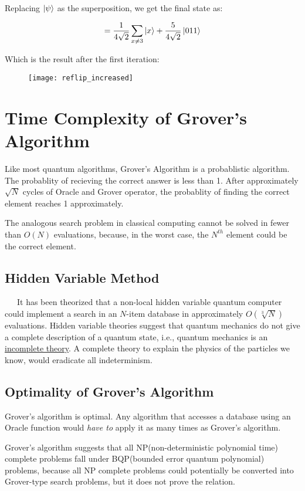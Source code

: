 \documentclass[a4paper]{article}
\begin{document}
Replacing $\ket{\psi}$ as the superposition, we get the final state as:

$$ = \frac{1}{4\sqrt{2}}\sum_{x \neq 3}{\ket{x}} + \frac{5}{4\sqrt{2}}\ket{011} $$

Which is the result after the first iteration:

\begin{figure}[h]
\texttt{[image: reflip\_increased]}
\centering
\end{figure}

\pagebreak

\section{ Time Complexity of Grover's Algorithm }

Like most quantum algorithms, Grover's Algorithm is a probablistic algorithm.
The probablity of recieving the correct answer is less than 1. After
approximately $\sqrt{N}$ cycles of Oracle and Grover operator, the probablity
of finding the correct element reaches 1 approximately.
\\
\par
The analogous search problem in classical computing cannot be solved in fewer
than $O(N)$ evaluations, because, in the worst case, the $N^{th}$ element could
be the correct element.
\\
\par
\subsection{Hidden Variable Method}
~~~It has been theorized that a non-local hidden variable quantum computer could implement
a search in an $N$-item database in approximately $O(\sqrt[3]{N})$ evaluations. Hidden
variable theories suggest that quantum mechanics do not give a complete description
of a quantum state, i.e., quantum mechanics is an \underline{incomplete theory}. A complete
theory to explain the physics of the particles we know, would eradicate all indeterminism.

\subsection{Optimality of Grover's Algorithm}
Grover's algorithm is optimal. Any algorithm that accesses a database using an Oracle
function would \textit{have to} apply it as many times as Grover's algorithm.
\\
\par
Grover's algorithm suggests that all NP(non-deterministic polynomial time) 
complete problems fall under BQP(bounded error quantum polynomial) problems, because
all NP complete problems could potentially be converted into Grover-type search problems,
but it does not prove the relation.
\end{document}
